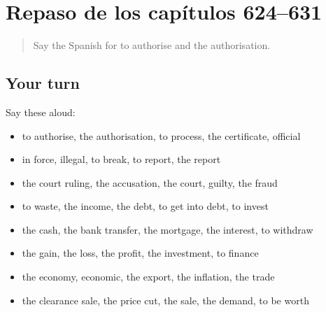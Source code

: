 \section[(dialogue)]{Repaso de los capítulos 624–631}

\label{lesson:ES-R631-repaso-624-631}



\begin{quote}
Say the Spanish for to authorise and the authorisation.
\end{quote}

\subsection*{Your turn}
Say these aloud:

\begin{itemize}
\raggedright
  \item to authorise, the authorisation, to process, the certificate, official
  \item in force, illegal, to break, to report, the report
  \item the court ruling, the accusation, the court, guilty, the fraud
  \item to waste, the income, the debt, to get into debt, to invest
  \item the cash, the bank transfer, the mortgage, the interest, to withdraw
  \item the gain, the loss, the profit, the investment, to finance
  \item the economy, economic, the export, the inflation, the trade
  \item the clearance sale, the price cut, the sale, the demand, to be worth
\end{itemize}

